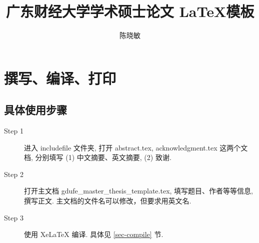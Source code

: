 \documentclass[class = professional, oneside]{gdufe_master_thesis}
\begin{document}
\title{广东财经大学学术硕士论文 \LaTeX 模板}
\author{陈晓敏}
\pagestyle{empty}

\frontmatter
\tableofcontents

\mainmatter
\chapter{撰写、编译、打印}

\section{具体使用步骤}

\begin{description}

    \item[Step 1]  进入 includefile 文件夹,  打开 abstract.tex, acknowledgment.tex 这两个文档,
          分别填写 (1) 中文摘要、英文摘要, (2) 致谢.

    \item[Step 2]  打开主文档 gdufe\_master\_thesis\_template.tex, 填写题目、作者等等信息, 撰写正文. 主文档的文件名可以修改，但要求用英文名.

    \item[Step 3]  使用 XeLaTeX 编译. 具体见 \ref{sec-compile} 节.

\end{description}
\end{document}
